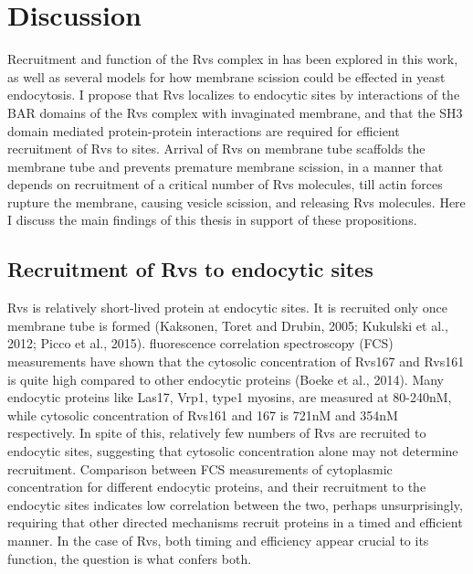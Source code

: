 
\chapter{Discussion}    
\label{Ch:Discussion}

Recruitment and function of the Rvs complex in has been explored in this work, as well as several models for how membrane scission could be effected in yeast endocytosis. 
I propose that Rvs localizes to endocytic sites by interactions of the BAR domains of the Rvs complex with invaginated membrane, and that the SH3 domain mediated protein-protein interactions are required for efficient recruitment of Rvs to sites. Arrival of Rvs on membrane tube scaffolds the membrane tube and prevents premature membrane scission, in a manner that depends on recruitment of a critical number of Rvs molecules, till actin forces rupture the membrane, causing vesicle scission, and releasing Rvs molecules. Here I discuss the main findings of this thesis in support of these propositions.



\section{Recruitment of Rvs to endocytic sites}
Rvs is relatively short-lived protein at endocytic sites. It is recruited only once membrane tube is formed (Kaksonen, Toret and Drubin, 2005; Kukulski et al., 2012; Picco et al., 2015). fluorescence correlation spectroscopy (FCS) measurements have shown that the cytosolic concentration of Rvs167 and Rvs161 is quite high compared to other endocytic proteins (Boeke et al., 2014). Many endocytic proteins like Las17, Vrp1, type1 myosins, are measured at 80-240nM, while cytosolic concentration of Rvs161 and 167 is 721nM and 354nM respectively. In spite of this, relatively few numbers of Rvs are recruited to endocytic sites, suggesting that cytosolic concentration alone may not determine recruitment. Comparison between FCS measurements of cytoplasmic concentration for different endocytic proteins, and their recruitment to the endocytic sites indicates low correlation between the two, perhaps unsurprisingly, requiring that other directed mechanisms recruit proteins in a timed and efficient manner. In the case of Rvs, both timing and efficiency appear crucial to its function, the question is what confers both. 




